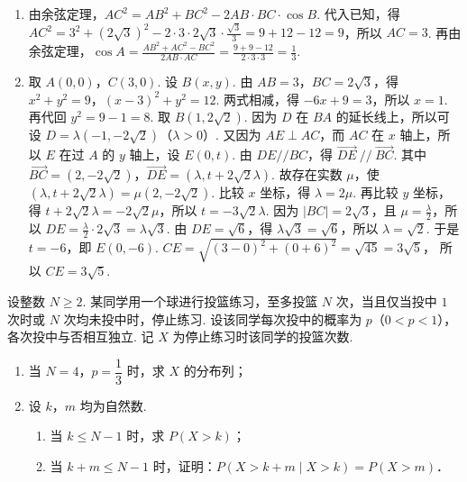 \begin{solution}
\begin{enumerate}
\item 由余弦定理，\(AC^2=AB^2+BC^2-2AB\cdot BC\cdot \cos B\). 代入已知，得 \(AC^2=3^2+\left( 2\sqrt{3} \right)^2-2\cdot 3\cdot 2\sqrt{3}\cdot \frac{\sqrt{3}}{3}=9+12-12=9\)，所以 \(AC=3\). 再由余弦定理，\(\cos A=\frac{AB^2+AC^2-BC^2}{2AB\cdot AC}=\frac{9+9-12}{2\cdot 3\cdot 3}=\frac{1}{3}\).

\item 取 \(A(0,0)\)，\(C(3,0)\). 设 \(B(x,y)\). 由 \(AB=3\)，\(BC=2\sqrt{3}\)，得 \(x^2+y^2=9\)，\(\left( x-3 \right)^2+y^2=12\). 两式相减，得 \(-6x+9=3\)，所以 \(x=1\). 再代回 \(y^2=9-1=8\). 取 \(B\left( 1,2\sqrt{2} \right)\).
因为 \(D\) 在 \(BA\) 的延长线上，所以可设 \(D=\lambda \left( -1,-2\sqrt{2} \right)\)（\(\lambda>0\)）. 又因为 \(AE\perp AC\)，而 \(AC\) 在 \(x\) 轴上，所以 \(E\) 在过 \(A\) 的 \(y\) 轴上，设 \(E(0,t)\).
由 \(DE // BC\)，得 \(\overrightarrow{DE}\ //\ \overrightarrow{BC}\). 其中 \(\overrightarrow{BC}=\left( 2,-2\sqrt{2} \right)\)，\(\overrightarrow{DE}=\left( \lambda,t+2\sqrt{2}\lambda \right)\). 故存在实数 \(\mu\)，使 \(\left( \lambda,t+2\sqrt{2}\lambda \right)=\mu \left( 2,-2\sqrt{2} \right)\). 比较 \(x\) 坐标，得 \(\lambda=2\mu\). 再比较 \(y\) 坐标，得 \(t+2\sqrt{2}\lambda=-2\sqrt{2}\mu\)，所以 \(t=-3\sqrt{2}\lambda\).
因为 \(\lvert BC\rvert =2\sqrt{3}\)，且 \(\mu=\frac{\lambda}{2}\)，所以 \(DE=\frac{\lambda}{2}\cdot 2\sqrt{3}=\lambda \sqrt{3}\). 由 \(DE=\sqrt{6}\)，得 \(\lambda \sqrt{3}=\sqrt{6}\)，所以 \(\lambda=\sqrt{2}\). 于是 \(t=-6\)，即 \(E(0,-6)\).
\(CE=\sqrt{\left( 3-0 \right)^2+\left( 0+6 \right)^2}=\sqrt{45}=3\sqrt{5}\)，
所以 \(CE=3\sqrt{5}\).
\end{enumerate}
\end{solution}

\begin{problem}
设整数 \(N\ge 2\). 某同学用一个球进行投篮练习，至多投篮 \(N\) 次，当且仅当投中 \(1\) 次时或 \(N\) 次均未投中时，停止练习. 设该同学每次投中的概率为 \(p\)（\(0<p<1\)），各次投中与否相互独立. 记 \(X\) 为停止练习时该同学的投篮次数.

\begin{enumerate}
\item 当 \(N=4\)，\(p=\dfrac{1}{3}\) 时，求 \(X\) 的分布列；
\item 设 \(k\)，\(m\) 均为自然数.
\begin{enumerate}
\item 当 \(k\le N-1\) 时，求 \(P(X>k)\)；
\item 当 \(k+m\le N-1\) 时，证明：\(P(X>k+m\mid X>k)=P(X>m)\)．
\end{enumerate}
\end{enumerate}
\end{problem}

